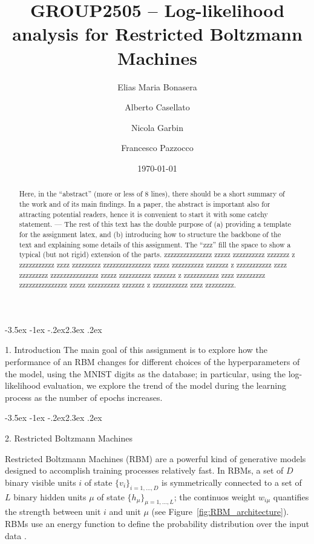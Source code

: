 \documentclass[prl,twocolumn]{revtex4-1}
\makeatletter
\renewcommand{\section}{\@startsection{section}{1}{\z@}%
	{-3.5ex \@plus -1ex \@minus -.2ex}{2.3ex \@plus.2ex}%
	{\normalfont\bfseries\raggedright}}
\makeatother
\begin{document}
\title{GROUP2505 -- Log-likelihood analysis for Restricted Boltzmann Machines}



\author{Elias Maria Bonasera}
\author{Alberto Casellato}
\author{Nicola Garbin}
\author{Francesco Pazzocco}

\date{\today}


\begin{abstract}
  Here, in the ``abstract'' (more or less of 8 lines), there should be a short summary of the work and of its main findings. In a paper, the abstract is important also for attracting potential readers, hence it is convenient to start it with some catchy statement. ---
 The rest of this text has the double purpose of (a) providing a template for the assignment latex, and (b) introducing how to structure the backbone of the text and explaining some details of this assignment. The ``zzz'' fill the space to show a typical (but not rigid) extension of the parts.
  zzzzzzzzzzzzzzz zzzzz zzzzzzzzzz zzzzzzz z zzzzzzzzzzz zzzz zzzzzzzzz
  zzzzzzzzzzzzzzz zzzzz zzzzzzzzzz zzzzzzz z zzzzzzzzzzz zzzz zzzzzzzzz
  zzzzzzzzzzzzzzz zzzzz zzzzzzzzzz zzzzzzz z zzzzzzzzzzz zzzz zzzzzzzzz
  zzzzzzzzzzzzzzz zzzzz zzzzzzzzzz zzzzzzz z zzzzzzzzzzz zzzz zzzzzzzzz.
\end{abstract}

\maketitle

\section{1. Introduction}
The main goal of this assignment is to explore how the performance of an RBM changes for different choices of the hyperparameters of the model, using the MNIST digits as the database; in particular, using the log-likelihood evaluation, we explore the trend of the model during the learning process as the number of epochs increases.


\section{2. Restricted Boltzmann Machines}

\setcounter{equation}{0}

Restricted Boltzmann Machines (RBM) are a powerful kind of generative models designed to accomplish training processes relatively fast. In RBMs, a set of $D$ binary visible units $i$ of state $\{v_i\}_{i=1, ..., D}$ is symmetrically connected to a set of $L$ binary hidden units $\mu$ of state $\{h_\mu\}_{\mu=1, ..., L}$; the continuos weight $w_{i\mu}$ quantifies the strength between unit $i$ and unit $\mu$ (see Figure~\ref{fig:RBM_architecture}). RBMs use an energy function to define the probability distribution over the input data \cite{pap1} \cite{pap2}.
\end{document}
